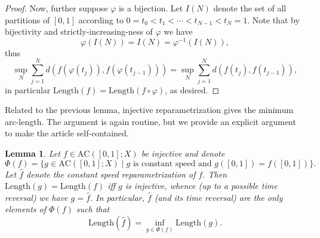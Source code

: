 \documentclass[aos, preprint]{imsart}
\theoremstyle{plain}
\newtheorem{lem}[theorem]{Lemma}
\theoremstyle{remark}
\begin{document}
\begin{appendix}
\begin{proof}
  Now, further suppose $\varphi$ is a bijection. Let $I(N)$ denote the
  set of all partitions of $[0,1]$ according to $0 = t_0 < t_1 <
  \cdots < t_{N-1} < t_N = 1$. Note that by bijectivity and
  strictly-increasing-ness of $\varphi$ we have
  \[
    \varphi(I(N)) = I(N) = \varphi^{-1}(I(N)),
  \]
  thus
  \[
    \sup_{N} \sum_{j=1}^N d(f(\varphi(t_j)), f(\varphi(t_{j-1})))
    = \sup_N \sum_{j=1}^N d(f(t_j), f(t_{j-1})),
  \]
  in particular $\mathrm{Length}(f) = \mathrm{Length}(f \circ
  \varphi)$, as desired.
\end{proof}
Related to the previous lemma, injective reparametrization gives the minimum arc-length. The argument is again routine, but we provide an explicit argument to make the article self-contained.
\begin{lem} \label{lem:arclen-most-efficient}
  Let $f \in \mathrm{AC}([0,1]; X)$ be injective and denote
  \[
    \Phi(f) = \{g \in \mathrm{AC}([0,1]; X) \mid g \text{ is
      constant speed and } g([0,1]) = f([0,1])\}.
  \]
  Let $\hat{f}$ denote the constant speed reparametrization of $f$.
  Then
  $\mathrm{Length}(g) = \mathrm{Length}(f)$ iff $g$ is injective,
  whence (up to a possible time reversal) we have $g = \hat{f}$.
 In particular,
 $\hat{f}$ (and its time reversal) are the only elements of $\Phi(f)$
  such that
  \[
    \mathrm{Length}(\hat{f}) = \inf_{g \in \Phi(f)} \mathrm{Length}(g).
  \]
\end{lem}



\end{appendix}
\end{document}
